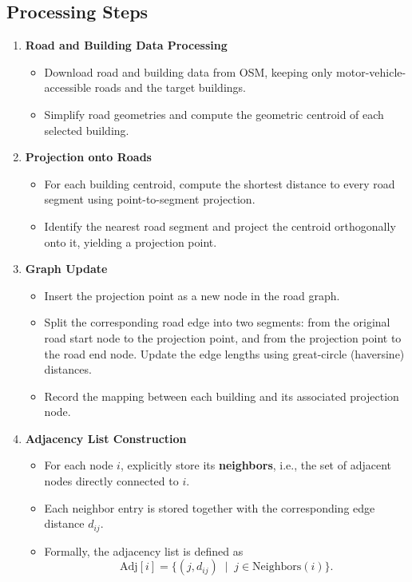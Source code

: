 \documentclass[fleqn,10pt]{olplainarticle}
\begin{document}
\subsection*{Processing Steps}
\begin{enumerate}
    \item \textbf{Road and Building Data Processing}
\begin{itemize}
    \item Download road and building data from OSM, keeping only motor-vehicle-accessible roads and the target buildings.
    \item Simplify road geometries and compute the geometric centroid of each selected building.
\end{itemize}
    
    \item \textbf{Projection onto Roads}
    \begin{itemize}
        \item For each building centroid, compute the shortest distance to every road segment using point-to-segment projection.
        \item Identify the nearest road segment and project the centroid orthogonally onto it, yielding a projection point.
    \end{itemize}
    
    \item \textbf{Graph Update}
    \begin{itemize}
        \item Insert the projection point as a new node in the road graph.
        \item Split the corresponding road edge into two segments: from the original road start node to the projection point, and from the projection point to the road end node. Update the edge lengths using great-circle (haversine) distances.
        \item Record the mapping between each building and its associated projection node.
    \end{itemize}
    
    \item \textbf{Adjacency List Construction}
    \begin{itemize}
        \item For each node $i$, explicitly store its \textbf{neighbors}, i.e., the set of adjacent nodes directly connected to $i$.
        \item Each neighbor entry is stored together with the corresponding edge distance $d_{ij}$.
        \item Formally, the adjacency list is defined as 
        \[
            \text{Adj}[i] = \{ (j, d_{ij}) \;\mid\; j \in \text{Neighbors}(i) \}.
        \]
    \end{itemize}
\end{enumerate}
\end{document}
